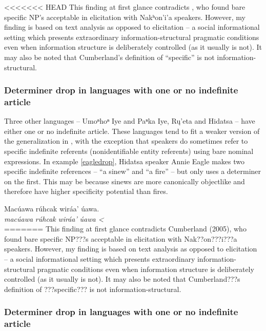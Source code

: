 \documentclass[output=paper]{LSP/langsci}
\begin{document}
<<<<<<< HEAD
This finding at first glance contradicts \citet{Cumberland2005}, who found bare specific NP’s acceptable in elicitation with Nakʰon’i’a speakers. However, my finding is based on text analysis as opposed to elicitation -- a social informational setting which presents extraordinary information-structural pragmatic conditions even when information structure is deliberately controlled (as it usually is not). It may also be noted that Cumberland’s definition of “specific” is not information-structural.

\subsubsection{Determiner drop in languages with one or no indefinite article}\label{droponeindef}

Three other languages -- Umoⁿhoⁿ Iye and Paⁿka Iye, Rų’eta and Hidatsa -- have either one or no indefinite article. These languages tend to fit a weaker version of the generalization in , with the exception that speakers do sometimes refer to specific indefinite referents (nonidentifiable entity referents) using bare nominal expressions. In example \ref{eagledrop}, Hidatsa speaker Annie Eagle makes two specific indefinite references -- “a sinew” and “a fire” -- but only uses a determiner on the first. This may be because sinews are more canonically objectlike and therefore have higher specificity potential than fires.

\ea\label{eagledrop}
Macúawa rúhcak wiráa’ úawa.\footnotemark\\
\gll	\emph{macúawa} 	\emph{rúhcak} 	\emph{wiráa’}	\emph{úawa <}\\
=======
This finding at first glance contradicts Cumberland (2005), who found bare specific NP???s acceptable in elicitation with Nak??on???i???a speakers. However, my finding is based on text analysis as opposed to elicitation -- a social informational setting which presents extraordinary information-structural pragmatic conditions even when information structure is deliberately controlled (as it usually is not). It may also be noted that Cumberland???s definition of ???specific??? is not information-structural.

\subsubsection{Determiner drop in languages with one or no indefinite article}\label{droponeindef}
\end{document}
